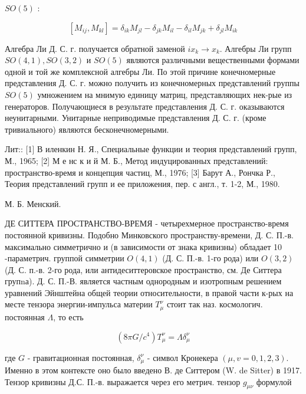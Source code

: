 \documentclass[10pt]{article}
\begin{document}
$S O(5)$ :



\[

\left[M_{i j}, M_{k l}\right]=\delta_{i k} M_{j l}-\delta_{j k} M_{i l}-\delta_{i l} M_{j k}+\delta_{j l} M_{i k}

\]



Алгебра Ли Д. С. г. получается обратной заменой $i x_{k} \rightarrow x_{k}$. Алгебры Ли групп $S O(4,1), S O(3,2)$ и $S O(5)$ являются различными вещественными формами одной и той же комплексной алгебры Ли. По этой причине конечномерные представления Д. С. г. можно получить из конечномерных представлений группы $S O(5)$ умножением на мнимую единицу матриц, представляющих нек-рые из генераторов. Получающиеся в результате представления Д. С. г. оказываются неунитарными. Унитарные неприводимые представления Д. С. г. (кроме тривиального) являются бесконечномерными.



Лит:: [1] В иленкин Н. Я., Специальные функции и теория представлений групп, М., 1965; [2] М е нс к и й М. Б., Метод индуцированных представлений: пространство-время и концепция частиц, М., 1976; [3] Барут А., Рончка Р., Теория представлений групп и ее приложения, пер. с англ., т. 1-2, М., 1980.



М. Б. Менский.



ДЕ СИТТЕРА ПРОСТРАНСТВО-ВРЕМЯ - четырехмерное пространство-время постоянной кривизны. Подобно Минковского пространству-времени, Д. С. П.-в. максимально симметрично и (в зависимости от знака кривизны) обладает 10 -параметрич. группой симметрии $O(4,1)$ (Д. С. П.-в. 1-го рода) или $O(3,2)$ (Д. С. п.-в. 2-го рода, или антидеситтеровское пространство, см. Де Ситтера групnа). Д. С. П.-В. является частным однородным и изотропным решением уравнений Эйнштейна общей теории относительности, в правой части к-рых на месте тензора энергии-импульса материи $T_{\mu}^{\nu}$ стоит так наз. космологич. постоянная $\Lambda$, то есть



\[

\left(8 \pi G / c^{4}\right) T_{\mu}^{\nu}=\Lambda \delta_{\mu}^{\nu}

\]



где $G$ - гравитационная постоянная, $\delta_{\mu}^{\nu}$ - символ Кронекера $(\mu, v=0,1,2,3)$. Именно в этом контексте оно было введено В. де Ситтером (W. de Sitter) в 1917. Тензор кривизны Д.С. П.-в. выражается через его метрич. тензор $g_{\mu \nu}$ формулой
\end{document}
